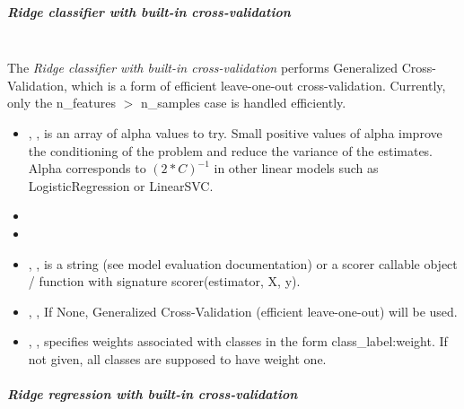 \subparagraph{Ridge classifier with built-in cross-validation}
\mbox{}
\\The \textit{Ridge classifier with built-in cross-validation} performs
Generalized Cross-Validation, which is a form of efficient leave-one-out
cross-validation.
%
Currently, only the n\_features $>$ n\_samples case is handled efficiently.
%
\begin{itemize}
  \item {}, , is an
  array of alpha values to try.
  Small positive values of alpha improve the conditioning of the problem and
  reduce the variance of the estimates.
  Alpha corresponds to $(2*C)^{-1}$ in other linear models such as
  LogisticRegression or LinearSVC.
  \item {}
  \item {}
  \item {}, , is a
  string (see model evaluation documentation) or a scorer callable object /
  function with signature scorer(estimator, X, y).
  \item {}, ,
  If None, Generalized Cross-Validation (efficient leave-one-out) will be used.
  \item {}, , specifies
  weights associated with classes in the form {class\_label:weight}.
  If not given, all classes are supposed to have weight one.
\end{itemize}
\subparagraph{Ridge regression with built-in cross-validation}
\mbox{}


